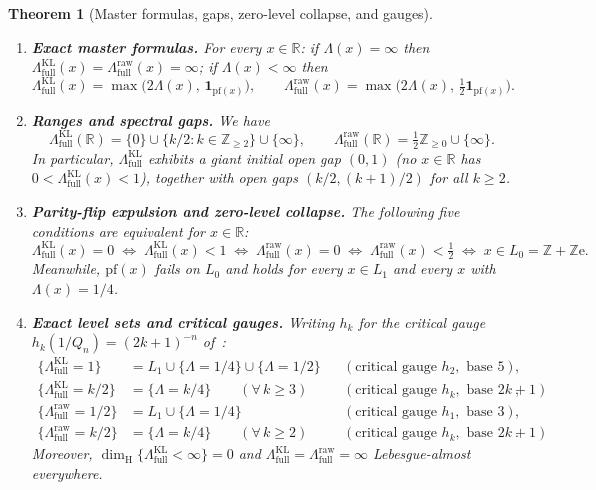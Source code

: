 \documentclass[11pt]{article}
\newtheorem{theorem}{Theorem}[section]
\theoremstyle{definition}
\theoremstyle{remark}
\newcommand{\R}{\mathbb{R}}
\newcommand{\Z}{\mathbb{Z}}
\newcommand{\ee}{\mathrm{e}}
\newcommand{\dimH}{\dim_{\mathrm{H}}}
\newcommand{\Lam}{\Lambda}
\begin{document}
\begin{theorem}[Master formulas, gaps, zero-level collapse, and gauges]\label{thm:full-spectra}
\leavevmode
\begin{enumerate}[label=\textup{(\roman*)},leftmargin=2.2em]
\item \textbf{Exact master formulas.} For every $x\in\R$: if $\Lam(x)=\infty$ then
$\Lam_{\mathrm{full}}^{\mathrm{KL}}(x)=\Lam_{\mathrm{full}}^{\mathrm{raw}}(x)=\infty$;
if $\Lam(x)<\infty$ then
\begin{equation}\label{eq:master-kl-raw}
\Lam_{\mathrm{full}}^{\mathrm{KL}}(x)=\max\bigl(2\Lam(x),\,\mathbf{1}_{\mathrm{pf}(x)}\bigr),\qquad
\Lam_{\mathrm{full}}^{\mathrm{raw}}(x)=\max\bigl(2\Lam(x),\,\tfrac12\mathbf{1}_{\mathrm{pf}(x)}\bigr).
\end{equation}
\item \textbf{Ranges and spectral gaps.} We have
\[
\Lam_{\mathrm{full}}^{\mathrm{KL}}(\R)=\{0\}\cup\bigl\{k/2:k\in\Z_{\ge2}\bigr\}\cup\{\infty\},\qquad
\Lam_{\mathrm{full}}^{\mathrm{raw}}(\R)=\tfrac12\Z_{\ge0}\cup\{\infty\}.
\]
In particular, $\Lam_{\mathrm{full}}^{\mathrm{KL}}$ exhibits a giant initial open
gap $(0,1)$ (no $x\in\R$ has $0<\Lam_{\mathrm{full}}^{\mathrm{KL}}(x)<1$), together
with open gaps $(k/2,(k+1)/2)$ for all $k\ge2$.
\item \textbf{Parity-flip expulsion and zero-level collapse.} The following five
conditions are equivalent for $x\in\R$:
\[
\Lam_{\mathrm{full}}^{\mathrm{KL}}(x)=0 \;\Longleftrightarrow\;
\Lam_{\mathrm{full}}^{\mathrm{KL}}(x)<1 \;\Longleftrightarrow\;
\Lam_{\mathrm{full}}^{\mathrm{raw}}(x)=0 \;\Longleftrightarrow\;
\Lam_{\mathrm{full}}^{\mathrm{raw}}(x)<\tfrac12 \;\Longleftrightarrow\;
x\in L_0=\Z+\Z\ee.
\]
Meanwhile, $\mathrm{pf}(x)$ fails on $L_0$ and holds for every $x\in L_1$ and
every $x$ with $\Lam(x)=1/4$.
\item \textbf{Exact level sets and critical gauges.} Writing $h_k$ for the critical
gauge $h_k(1/Q_n)=(2k+1)^{-n}$ of~\cite{Paper2}:
\begin{align*}
\{\Lam_{\mathrm{full}}^{\mathrm{KL}}=1\}&=L_1\cup\{\Lam=1/4\}\cup\{\Lam=1/2\}&&(\text{critical gauge }h_2,\text{ base }5),\\
\{\Lam_{\mathrm{full}}^{\mathrm{KL}}=k/2\}&=\{\Lam=k/4\}\qquad(\forall\,k\ge3)&&(\text{critical gauge }h_k,\text{ base }2k+1),\\
\{\Lam_{\mathrm{full}}^{\mathrm{raw}}=1/2\}&=L_1\cup\{\Lam=1/4\}&&(\text{critical gauge }h_1,\text{ base }3),\\
\{\Lam_{\mathrm{full}}^{\mathrm{raw}}=k/2\}&=\{\Lam=k/4\}\qquad(\forall\,k\ge2)&&(\text{critical gauge }h_k,\text{ base }2k+1).
\end{align*}
Moreover, $\dimH\{\Lam_{\mathrm{full}}^{\mathrm{KL}}<\infty\}=0$ and
$\Lam_{\mathrm{full}}^{\mathrm{KL}}=\Lam_{\mathrm{full}}^{\mathrm{raw}}=\infty$
Lebesgue-almost everywhere.
\end{enumerate}
\end{theorem}
\end{document}
